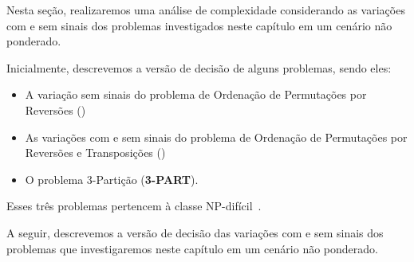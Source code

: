 Nesta seção, realizaremos uma análise de complexidade considerando as variações com e sem sinais dos problemas investigados neste capítulo em um cenário não ponderado.

Inicialmente, descrevemos a versão de decisão de alguns problemas, sendo eles:
\begin{itemize}
  \item A variação sem sinais do problema de Ordenação de Permutações por Reversões (\SbR)
  \item As variações com e sem sinais do problema de Ordenação de Permutações por Reversões e Transposições (\SbRT)
  \item O problema $3$-Partição (\textbf{3-PART}).
\end{itemize}
Esses três problemas pertencem à classe NP-difícil~\cite{1999a-caprara,2019b-oliveira-etal,1990-garey-johnson}.

\begin{decision}
\end{decision}

\begin{decision}
\end{decision}

\begin{decision}
\end{decision}

A seguir, descrevemos a versão de decisão das variações com e sem sinais dos problemas que investigaremos neste capítulo em um cenário não ponderado.

